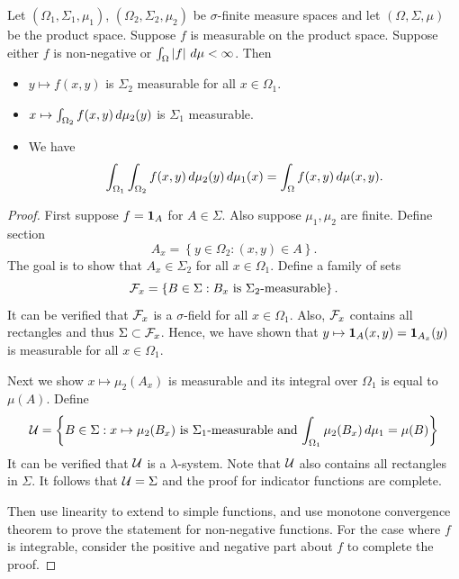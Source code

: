 \documentclass[a4paper]{article}
\begin{document}
\begin{thm}
  Let $(\Omega_1, \Sigma_1, \mu_1)$, $(\Omega_2, \Sigma_2, \mu_2)$
  be $\sigma$-finite measure spaces and let $(\Omega, \Sigma, \mu)$
  be the product space. Suppose $f$ is measurable on the product space.
  Suppose either $f$ is non-negative or $\int_\Omega \left\lvert f\right\rvert \, d \mu <
    \infty$. Then
  \begin{itemize}
    \item $y \mapsto f(x, y)$ is $\Sigma_2$ measurable for all $x \in \Omega_1$.
    \item $x \mapsto \int_{\Omega_2} f(x, y) \, d \mu_2 (y)$ is
          $\Sigma_1$ measurable.
    \item We have
          \[
            \int_{\Omega_1} \int_{\Omega_2} f(x, y) \, d \mu_2 (y) \, d \mu_1 (x)
            = \int_\Omega f(x, y) \, d \mu(x, y).
          \]
  \end{itemize}
\end{thm}

\begin{proof}
  First suppose $f = \operatorname{\mathbf{1}}_{A}$ for $A \in \Sigma$.
  Also suppose $\mu_1, \mu_2$ are finite. Define section
  \[
    A_x = \left\{ y \in \Omega_2 : (x, y) \in A \right\}.
  \]
  The goal is to show that $A_x \in \Sigma_2$ for all $x \in \Omega_1$.
  Define a family of sets
  \[
    \mathcal{F}_x = \left\{ B \in \Sigma : \text{$B_x$ is $\Sigma_2$-measurable} \right\}.
  \]
  It can be verified that $\mathcal{F}_x$ is a $\sigma$-field for all $x \in \Omega_1$.
  Also, $\mathcal{F}_x$ contains all rectangles and thus $\Sigma \subset \mathcal{F}_x$.
  Hence, we have shown that $y \mapsto \operatorname{\mathbf{1}}_A (x, y) = \operatorname{\mathbf{1}}_{A_x} (y)$
  is measurable for all $x \in \Omega_1$.

  Next we show $x \mapsto \mu_2 (A_x)$ is measurable
  and its integral over $\Omega_1$ is equal to $\mu (A)$.
  Define
  \[
    \mathcal{U} = \left\{ B \in \Sigma : \text{$x \mapsto \mu_2(B_x)$ is
  $\Sigma_1$-measurable and $\int_{\Omega_1} \mu_2(B_x) \, d \mu_1 = \mu (B)$} \right\}
  \]
  It can be verified that $\mathcal{U}$ is a $\lambda$-system.
  Note that $\mathcal{U}$ also contains all rectangles in $\Sigma$.
  It follows that $\mathcal{U} = \Sigma$ and the proof for
  indicator functions are complete.

  Then use linearity to extend to simple functions, and use monotone
  convergence theorem to prove the statement for non-negative functions.
  For the case where $f$ is integrable, consider the positive and
  negative part about $f$ to complete the proof.

\end{proof}
\end{document}
